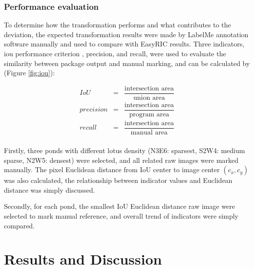 \documentclass{configs/bmcart}
\begin{document}
\subsubsection*{Performance evaluation}
To determine how the transformation performs and what contributes to the deviation, the expected transformation results were made by LabelMe annotation software manually and used to compare with EasyRIC results. Three indicators, \acrfull*{iou} performance criterion \cite{everingham_pascal_2010}, precision, and recall, were used to evaluate the similarity between package output and manual marking, and can be calculated by (Figure \ref{fig:iou}): 

$$
\begin{array}{lcl}
  IoU & = & \dfrac{\text{intersection area}}{\text{union area}} \\
  precision & = & \dfrac{\text{intersection area}}{\text{program area}} \\
  recall & = & \dfrac{\text{intersection area}}{\text{manual area}} \\
\end{array}
$$

Firstly, three ponds with different lotus density (N3E6: sparsest, S2W4: medium sparse, N2W5: densest) were selected, and all related raw images were marked manually. The pixel Euclidean distance from IoU center to image center $(c_x, c_y)$ was also calculated, the relationship between indicator values and Euclidean distance was simply discussed.

Secondly, for each pond, the smallest IoU Euclidean distance raw image were selected to mark manual reference, and overall trend of indicators were simply compared.

\section*{Results and Discussion}
\end{document}
